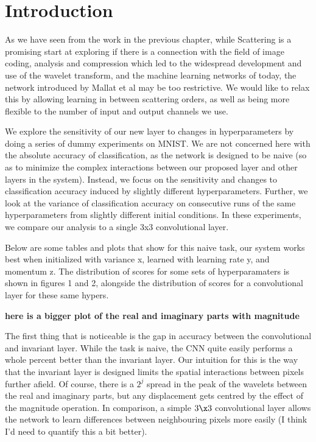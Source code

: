 \section{Introduction}

As we have seen from the work in the previous chapter, while Scattering is a
promising start at exploring if there is a connection with the field of image
coding, analysis and compression which led to the widespread development and use
of the wavelet transform, and the machine learning networks of today, the
network introduced by Mallat et al may be too restrictive. We would like to
relax this by allowing learning in between scattering orders, as well as being
more flexible to the number of input and output channels we use. 

We explore the sensitivity of our new layer to changes in hyperparameters by
doing a series of dummy experiments on MNIST. We are not concerned here with the
absolute accuracy of classification, as the network is designed to be naive (so
as to minimize the complex interactions between our proposed layer and other
layers in the system). Instead, we focus on the sensitivity and changes to
classification accuracy induced by slightly different hyperparameters. Further,
we look at the variance of classification accuracy on consecutive runs of the
same hyperparameters from slightly different initial conditions. In these
experiments, we compare our analysis to a single 3x3 convolutional layer.

Below are some tables and plots that show for this naive task, our system works best when initialized
with variance x, learned with learning rate y, and momentum z. The distribution
of scores for some sets of hyperparamaters is shown in figures 1 and 2,
alongside the distribution of scores for a convolutional layer for these same
hypers.

\textbf{here is a bigger plot of the real and imaginary parts with magnitude}

The first thing that is noticeable is the gap in accuracy between the
convolutional and invariant layer. While the task is naive, the CNN quite easily
performs a whole percent better than the invariant layer. Our intuition for this
is the way that the invariant layer is designed limits the spatial interactions
between pixels further afield. Of course, there is a $2^j$ spread in the peak of
the wavelets between the real and imaginary parts, but any displacement gets
centred by the effect of the magnitude operation. In comparison, a simple $3\x
3$ convolutional layer allows the network to learn differences between
neighbouring pixels more easily (I think I'd need to quantify this a bit
better). 

